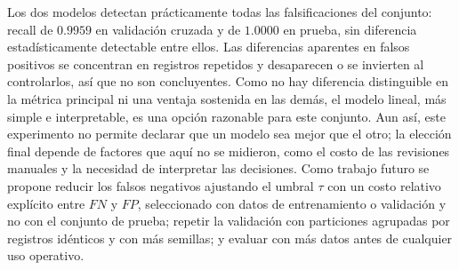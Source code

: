 \documentclass[conference]{IEEEtran}
\begin{document}
	Los dos modelos detectan prácticamente todas las falsificaciones del conjunto: recall de $0.9959$ en validación cruzada y de $1.0000$ en prueba, sin diferencia estadísticamente detectable entre ellos. Las diferencias aparentes en falsos positivos se concentran en registros repetidos y desaparecen o se invierten al controlarlos, así que no son concluyentes. Como no hay diferencia distinguible en la métrica principal ni una ventaja sostenida en las demás, el modelo lineal, más simple e interpretable, es una opción razonable para este conjunto. Aun así, este experimento no permite declarar que un modelo sea mejor que el otro; la elección final depende de factores que aquí no se midieron, como el costo de las revisiones manuales y la necesidad de interpretar las decisiones. Como trabajo futuro se propone reducir los falsos negativos ajustando el umbral $\tau$ con un costo relativo explícito entre $FN$ y $FP$, seleccionado con datos de entrenamiento o validación y no con el conjunto de prueba; repetir la validación con particiones agrupadas por registros idénticos y con más semillas; y evaluar con más datos antes de cualquier uso operativo.
	
\end{document}
